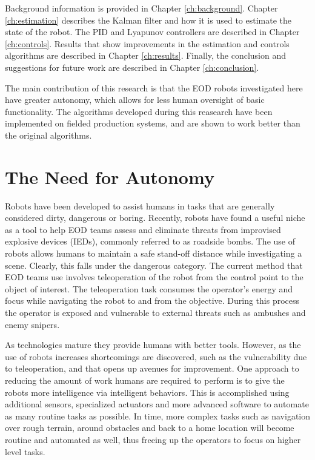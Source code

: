 Background information is provided in Chapter \ref{ch:background}. Chapter \ref{ch:estimation} describes the Kalman filter and how it is used to estimate the state of the robot. The PID and Lyapunov controllers are described in Chapter \ref{ch:controls}. Results that show improvements in the estimation and controls algorithms are described in Chapter \ref{ch:results}. Finally, the conclusion and suggestions for future work are described in Chapter \ref{ch:conclusion}.

The main contribution of this research is that the EOD robots investigated here have greater autonomy, which allows for less human oversight of basic functionality. The algorithms developed during this reasearch have been implemented on fielded production systems, and are shown to work better than the original algorithms.

\section{The Need for Autonomy}
\label{sec:needforautonomy}
Robots have been developed to assist humans in tasks that are generally considered dirty, dangerous or boring. Recently, robots have found a useful niche as a tool to help EOD teams assess and eliminate threats from improvised explosive devices (IEDs), commonly referred to as roadside bombs. The use of robots allows humans to maintain a safe stand-off distance while investigating a scene. Clearly, this falls under the dangerous category. The current method that EOD teams use involves teleoperation of the robot from the control point to the object of interest. The teleoperation task consumes the operator's energy and focus while navigating the robot to and from the objective. During this process the operator is exposed and vulnerable to external threats such as ambushes and enemy snipers.

As technologies mature they provide humans with better tools. However, as the use of robots increases shortcomings are discovered, such as the vulnerability due to teleoperation, and that opens up avenues for improvement. One approach to reducing the amount of work humans are required to perform is to give the robots more intelligence via intelligent behaviors. This is accomplished using additional sensors, specialized actuators and more advanced software to automate as many routine tasks as possible. In time, more complex tasks such as navigation over rough terrain, around obstacles and back to a home location will become routine and automated as well, thus freeing up the operators to focus on higher level tasks.

